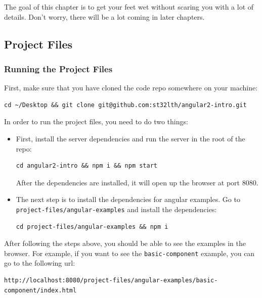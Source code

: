 \documentclass[12pt,]{article}
\begin{document}
The goal of this chapter is to get your feet wet without scaring you
with a lot of details. Don't worry, there will be a lot coming in later
chapters.

\subsection{Project Files}\label{project-files}

\hypertarget{running-the-project-files}{\subsubsection{Running the
Project Files}\label{running-the-project-files}}

First, make sure that you have cloned the code repo somewhere on your
machine:

\begin{verbatim}
cd ~/Desktop && git clone git@github.com:st32lth/angular2-intro.git
\end{verbatim}

In order to run the project files, you need to do two things:

\begin{itemize}
\item
  First, install the server dependencies and run the server in the root
  of the repo:

\begin{verbatim}
cd angular2-intro && npm i && npm start
\end{verbatim}

  After the dependencies are installed, it will open up the browser at
  port 8080.
\item
  The next step is to install the dependencies for angular examples. Go
  to \texttt{project-files/angular-examples} and install the
  dependencies:

\begin{verbatim}
cd project-files/angular-examples && npm i
\end{verbatim}
\end{itemize}

After following the steps above, you should be able to see the examples
in the browser. For example, if you want to see the
\texttt{basic-component} example, you can go to the following url:

\begin{verbatim}
http://localhost:8080/project-files/angular-examples/basic-component/index.html
\end{verbatim}
\end{document}
